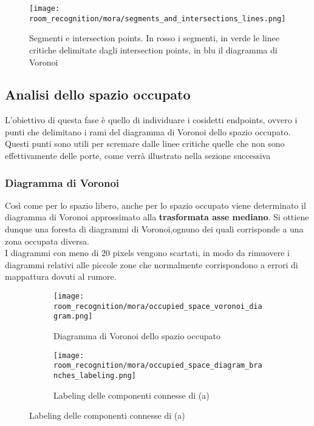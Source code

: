 \begin{figure}[H]
  \centering
  \texttt{[image: room\_recognition/mora/segments\_and\_intersections\_lines.png]}
  \caption{Segmenti e intersection points. In rosso i segmenti, in verde le linee critiche delimitate dagli intersection points, in blu il diagramma di Voronoi}
\end{figure}
\subsection{Analisi dello spazio occupato}
L'obiettivo di questa fase è quello di individuare i cosidetti endpoints, ovvero i punti che delimitano i rami del diagramma di Voronoi dello spazio occupato. Questi punti sono utili per scremare dalle linee critiche quelle che non sono effettivamente delle porte, come verrà illustrato nella sezione successiva
\subsubsection{Diagramma di Voronoi}
Così come per lo spazio libero, anche per lo spazio occupato viene determinato il diagramma di Voronoi approssimato alla \textbf{trasformata asse mediano}. Si ottiene dunque una foresta di diagrammi di Voronoi,ognuno dei quali corrisponde a una zona occupata diversa. \\
I diagrammi con meno di 20 pixels vengono scartati, in modo da rimuovere i diagrammi relativi alle piccole zone che normalmente corrispondono a errori di mappattura dovuti al rumore.

\begin{figure}[H]
  \centering
  \begin{subfigure}[t]{0.45\textwidth}
    \centering
    \texttt{[image: room\_recognition/mora/occupied\_space\_voronoi\_diagram.png]}
    \caption{Diagramma di Voronoi dello spazio occupato}
  \end{subfigure}
  \begin{subfigure}[t]{0.45\textwidth}
    \centering
    \texttt{[image: room\_recognition/mora/occupied\_space\_diagram\_branches\_labeling.png]}
    \caption{Labeling delle componenti connesse di (a)}
  \end{subfigure}
\end{figure}

